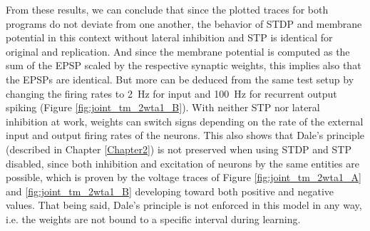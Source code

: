 From these results, we can conclude that since the plotted traces for both programs do not deviate from one another, the behavior of STDP and membrane potential in this context without lateral inhibition and STP is identical for original and replication. And since the membrane potential is computed as the sum of the EPSP scaled by the respective synaptic weights, this implies also that the EPSPs are identical. But more can be deduced from the same test setup by changing the firing rates to \SI{2}{\hertz} for input and \SI{100}{\hertz} for recurrent output spiking (Figure \ref{fig:joint_tm_2wta1_B}). With neither STP nor lateral inhibition at work, weights can switch signs depending on the rate of the external input and output firing rates of the neurons. This also shows that Dale's principle (described in Chapter \ref{Chapter2}) 
is not preserved when using STDP and STP disabled, since both inhibition and excitation of neurons by the same entities are possible, which is proven by the voltage traces of Figure \ref{fig:joint_tm_2wta1_A} and \ref{fig:joint_tm_2wta1_B} developing toward both positive and negative values. That being said, Dale's principle is not enforced in this model in any way, i.e. the weights are not bound to a specific interval during learning.

